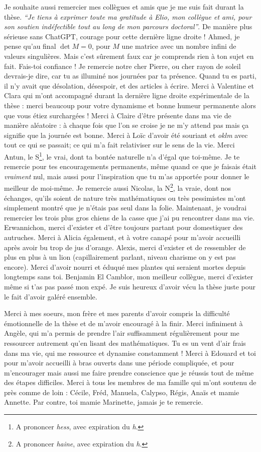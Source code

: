 Je souhaite aussi remercier mes collègues et amis que je me suis fait durant la thèse. 
\emph{``Je tiens à exprimer toute ma gratitude à Elio, mon collègue et ami, pour son soutien indéfectible tout au long de mon parcours doctoral''}.
De manière plus sérieuse sans ChatGPT, courage pour cette dernière ligne droite ! Ahmed, je pense qu'au final $\det{M} = 0$, pour $M$ une matrice avec un nombre infini de valeurs singulières. Mais c'est sûrement faux car je comprends rien à ton sujet en fait. Fais-toi confiance ! 
Je remercie notre cher Pierre, ou cher rayon de soleil devrais-je dire, car tu as illuminé nos journées par ta présence. Quand tu es parti, il n'y avait que désolation, désespoir, et des articles à écrire.
Merci à Valentine et Clara qui m'ont accompagné
durant la dernière ligne droite expérimentale de la thèse : merci beaucoup pour votre dynamisme et bonne humeur permanente alors que vous étiez surchargées !
Merci à Claire d'être présente dans ma vie de manière aléatoire : à chaque fois que l'on se croise je ne m'y attend pas mais ça signifie que la journée est bonne.
Merci à Loïc d'avoir été souriant et \emph{oklm} avec tout ce qui se passait; ce qui m'a fait relativiser sur le sens de la vie.
Merci Antun, le S\footnote{A prononcer \emph{hess}, avec expiration du \emph{h}.}, le vrai, dont ta bontée naturelle n'a d'égal que toi-même.
Je te remercie pour tes encouragements permanents, même quand ce que je faisais était \emph{vraiment} nul, mais aussi pour l'inspiration que tu m'as apportée pour donner le meilleur de moi-même.
Je remercie aussi Nicolas, la N\footnote{A prononcer \emph{haine}, avec expiration du \emph{h}.}, la vraie, dont nos échanges, qu'ils soient de nature très mathématiques ou très pessimistes m'ont simplement
montré que je n'étais pas seul dans la folie. Maintenant, je voudrai remercier les trois plus gros chiens de la casse que j'ai pu rencontrer dans ma vie. 
Erwannichon, merci d'exister et d'être toujours partant pour domestiquer des autruches. Merci à Alicia également,
et à votre canapé pour m'avoir accueilli après avoir bu trop de jus d'orange. Alexis, merci d'exister et 
de ressembler de plus en plus à un lion (capillairement parlant, niveau charisme on y est pas encore). Merci d'avoir nourri et 
éduqué mes plantes qui seraient mortes depuis longtemps sans toi. Benjamin El Camblor, mon meilleur collègue, merci d'exister même si 
t'as pas passé mon expé. Je suis heureux d'avoir vécu la thèse juste pour le fait d'avoir galéré ensemble.

Merci à mes soeurs, mon frère et mes parents d'avoir compris la difficulté émotionnelle de la thèse et de m'avoir encouragé à la finir.
Merci infiniment à Angèle, qui m'a permis de prendre l'air suffisamment régulièrement pour me ressourcer autrement qu'en lisant des mathématiques. Tu es un vent d'air frais dans ma vie, qui me ressource et dynamise constamment !
Merci à Edouard et toi pour m'avoir accueilli à bras ouverts dans une période compliquée, et pour m'encourager mais aussi me faire prendre conscience que je réussis tout de même des étapes difficiles.
Merci à tous les membres de ma famille qui m'ont soutenu de près comme de loin : Cécile, Fréd, Manuela, Calypso, Régis, Anaïs et mamie Annette. Par contre, toi mamie Marinette, jamais je te remercie.

